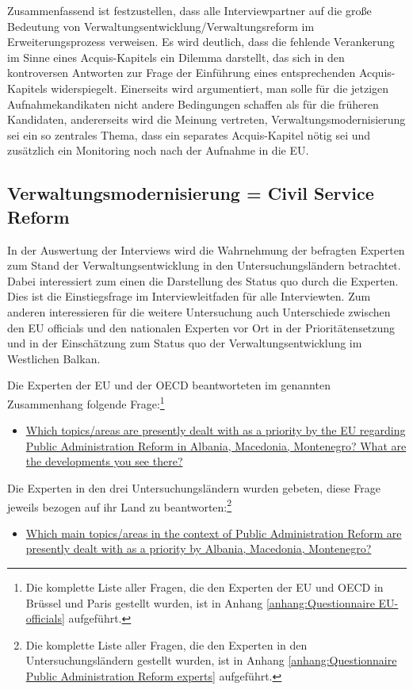 Zusammenfassend ist festzustellen, dass alle Interviewpartner auf die große Bedeutung von Verwaltungsentwicklung/Verwaltungsreform im Erweiterungsprozess verweisen. Es wird deutlich, dass die fehlende Verankerung im Sinne eines Acquis-Kapitels ein Dilemma darstellt, das sich in den kontroversen Antworten zur Frage der Einführung eines entsprechenden Acquis-Kapitels widerspiegelt. Einerseits wird argumentiert, man solle für die jetzigen Aufnahmekandikaten nicht andere Bedingungen schaffen als für die früheren Kandidaten, andererseits wird die Meinung vertreten, Verwaltungsmodernisierung sei ein so zentrales Thema, dass ein separates Acquis-Kapitel nötig sei und zusätzlich ein Monitoring noch nach der Aufnahme in die EU.

\subsection{Verwaltungsmodernisierung = Civil Service Reform }
In der Auswertung der Interviews wird die Wahrnehmung der befragten Experten zum Stand der Verwaltungsentwicklung in den Untersuchungsländern betrachtet. Dabei interessiert zum einen die Darstellung des Status quo durch die Experten. Dies ist die Einstiegsfrage im Interviewleitfaden für alle Interviewten. Zum anderen interessieren für die weitere Untersuchung auch Unterschiede zwischen den EU officials und den nationalen Experten vor Ort in der Prioritätensetzung und in der Einschätzung zum Status quo der Verwaltungsentwicklung im Westlichen Balkan. 

Die Experten der EU und der OECD beantworteten im genannten Zusammenhang folgende Frage:\footnote{Die komplette Liste aller Fragen, die den Experten der EU und OECD in Brüssel und Paris gestellt wurden, ist in Anhang \ref{anhang:Questionnaire EU-officials} aufgeführt.}
\begin{itemize}[label={}]
\item \ul{Which topics/areas are presently dealt with as a priority by the EU regarding Public Administration Reform in Albania, Macedonia, Montenegro? What are the developments you see there?}
\end{itemize}

Die Experten in den drei Untersuchungsländern wurden gebeten, diese Frage jeweils bezogen auf ihr Land zu beantworten:\footnote{Die komplette Liste aller Fragen, die den Experten in den Untersuchungsländern gestellt wurden, ist in Anhang \ref{anhang:Questionnaire Public Administration Reform experts} aufgeführt.}
\begin{itemize}[label={}]
\item \ul{Which main topics/areas in the context of Public Administration Reform are presently dealt with as a priority by Albania, Macedonia, Montenegro?}
\end{itemize}

